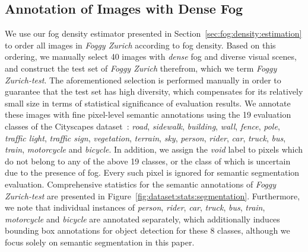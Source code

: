 \documentclass[twocolumn]{svjour3}          \smartqed  \usepackage{graphicx}
\begin{document}
\subsection{Annotation of Images with Dense Fog}
\label{sec:dataset:annotations}

We use our fog density estimator presented in Section~\ref{sec:fog:density:estimation} to order all images in \emph{Foggy Zurich} according to fog density. Based on this ordering, we manually select 40 images with \emph{dense} fog and diverse visual scenes, and construct the test set of \emph{Foggy Zurich} therefrom, which we term \emph{Foggy Zurich-test}. The aforementioned selection is performed manually in order to guarantee that the test set has high diversity, which compensates for its relatively small size in terms of statistical significance of evaluation results. We annotate these images with fine pixel-level semantic annotations using the 19 evaluation classes of the Cityscapes dataset~\cite{Cityscapes}: \emph{road}, \emph{sidewalk}, \emph{building}, \emph{wall}, \emph{fence}, \emph{pole}, \emph{traffic light}, \emph{traffic sign}, \emph{vegetation}, \emph{terrain}, \emph{sky}, \emph{person}, \emph{rider}, \emph{car}, \emph{truck}, \emph{bus}, \emph{train}, \emph{motorcycle} and \emph{bicycle}. In addition, we assign the \emph{void} label to pixels which do not belong to any of the above 19 classes, or the class of which is uncertain due to the presence of fog. Every such pixel is ignored for semantic segmentation evaluation. Comprehensive statistics for the semantic annotations of \emph{Foggy Zurich-test} are presented in Figure~\ref{fig:dataset:stats:segmentation}. Furthermore, we note that individual instances of \emph{person}, \emph{rider}, \emph{car}, \emph{truck}, \emph{bus}, \emph{train}, \emph{motorcycle} and \emph{bicycle} are annotated separately, which additionally induces bounding box annotations for object detection for these 8 classes, although we focus solely on semantic segmentation in this paper. 
\end{document}
